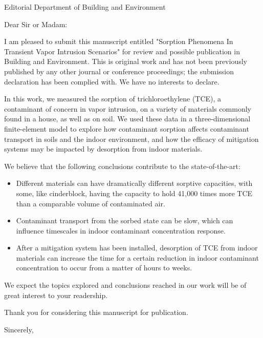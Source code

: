 \documentclass{letter}
\begin{document}
\begin{letter}{Editorial Department of Building and Environment}
\opening{Dear Sir or Madam:}

I am pleased to submit this manuscript entitled "Sorption Phenomena In Transient Vapor Intrusion Scenarios" for review and possible publication in Building and Environment.
This is original work and has not been previously published by any other journal or conference proceedings; the submission declaration has been complied with.
We have no interests to declare.

In this work, we measured the sorption of trichloroethylene (TCE), a contaminant of concern in vapor intrusion, on a variety of materials commonly found in a house, as well as on soil.
We used these data in a three-dimensional finite-element model to explore how contaminant sorption affects contaminant transport in soils and the indoor environment, and how the efficacy of mitigation systems may be impacted by desorption from indoor materials.

We believe that the following conclusions contribute to the state-of-the-art:
\begin{itemize}
  \item Different materials can have dramatically different sorptive capacities, with some, like cinderblock, having the capacity to hold 41,000 times more TCE than a comparable volume of contaminated air.
  \item Contaminant transport from the sorbed state can be slow, which can influence timescales in indoor contaminant concentration response.
  \item After a mitigation system has been installed, desorption of TCE from indoor materials can increase the time for a certain reduction in indoor contaminant concentration to occur from a matter of hours to weeks.
\end{itemize}
We expect the topics explored and conclusions reached in our work will be of great interest to your readership.

Thank you for considering this manuscript for publication.
\closing{Sincerely,}

\end{letter}
\end{document}
